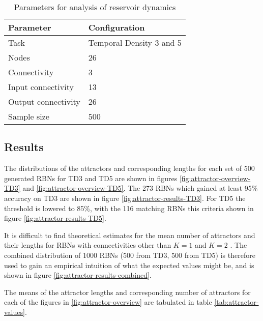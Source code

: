 \begin{table}[h]
    \centering
    \caption{Parameters for analysis of reservoir dynamics}
    \label{tab:reservoir-dynamics-parameters}
    \begin{tabular}{ll}
        \hline
        \textbf{Parameter} & \textbf{Configuration} \\
        \hline
        \hline
        Task                & Temporal Density 3 and 5  \\
        Nodes               & 26                        \\
        Connectivity        & 3                         \\
        Input connectivity  & 13                        \\
        Output connectivity & 26                        \\
        Sample size         & 500 \\
        \hline
    \end{tabular}
\end{table}

\subsection{Results}

The distributions of the attractors and corresponding lengths for each set of 500 generated RBNs for TD3 and TD5 are shown in figures \ref{fig:attractor-overview-TD3} and \ref{fig:attractor-overview-TD5}.
The 273 RBNs which gained at least 95\% accuracy on TD3 are shown in figure \ref{fig:attractor-results-TD3}.
For TD5 the threshold is lowered to 85\%,
with the 116 matching RBNs this criteria shown in figure \ref{fig:attractor-results-TD5}.

It is difficult to find theoretical estimates for the mean number of attractors and their lengths for RBNs with connectivities other than $ K = 1 $ \cite{drossel2005number} and $ K = 2 $ \cite{samuelsson2003superpolynomial}.
The combined distribution of 1000 RBNs (500 from TD3, 500 from TD5) is therefore used to gain an empirical intuition of what the expected values might be,
and is shown in figure \ref{fig:attractor-results-combined}.

The means of the attractor lengths and corresponding number of attractors for each of the figures in \ref{fig:attractor-overview} are tabulated in table \ref{tab:attractor-values}.

